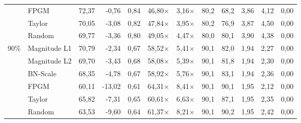 \begin{table}[H]
{{\begin{tabular}{c l rr rrr rr rrr}
     & FPGM & 72,37 & -0,76 & 0,84 & 46,80$\times$ & 3,16$\times$ & 80,2 & 68,2 & 3,86 & 4,12 & 0,00 \\
     & Taylor & 70,05 & -3,08 & 0,82 & 47,84$\times$ & 3,95$\times$ & 80,2 & 76,9 & 3,87 & 4,50 & 0,00 \\
     & Random & 69,77 & -3,36 & 0,80 & 49,05$\times$ & 4,47$\times$ & 80,0 & 80,1 & 3,90 & 4,38 & 0,00 \\
    \midrule
    \multirow{6}{*}{90\%} & Magnitude L1 & 70,79 & -2,34 & 0,67 & 58,52$\times$ & 5,41$\times$ & 90,1 & 82,0 & 1,94 & 2,27 & 0,00 \\
     & Magnitude L2 & 69,70 & -3,43 & 0,68 & 58,08$\times$ & 5,39$\times$ & 90,1 & 81,8 & 1,94 & 2,30 & 0,00 \\
     & BN-Scale & 68,35 & -4,78 & 0,67 & 58,92$\times$ & 5,76$\times$ & 90,1 & 83,1 & 1,94 & 2,36 & 0,00 \\
     & FPGM & 60,11 & -13,02 & 0,61 & 64,31$\times$ & 8,41$\times$ & 90,1 & 90,1 & 1,95 & 2,12 & 0,00 \\
     & Taylor & 65,82 & -7,31 & 0,65 & 60,61$\times$ & 6,63$\times$ & 90,1 & 87,1 & 1,95 & 2,35 & 0,00 \\
     & Random & 63,53 & -9,60 & 0,64 & 61,37$\times$ & 8,21$\times$ & 90,1 & 90,2 & 1,95 & 2,42 & 0,00 \\
    \bottomrule
  \end{tabular}}}
\end{table}
